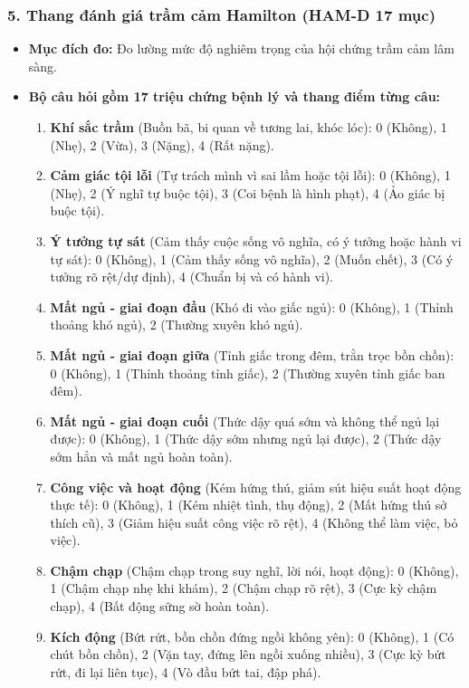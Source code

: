\documentclass[12pt,a4paper]{article}
\begin{document}
\subsubsection*{5. Thang đánh giá trầm cảm Hamilton (HAM-D 17 mục)}
\begin{itemize}
    \item \textbf{Mục đích đo:} Đo lường mức độ nghiêm trọng của hội chứng trầm cảm lâm sàng.
    \item \textbf{Bộ câu hỏi gồm 17 triệu chứng bệnh lý và thang điểm từng câu:}
    \begin{enumerate}
        \item \textbf{Khí sắc trầm} (Buồn bã, bi quan về tương lai, khóc lóc): 0 (Không), 1 (Nhẹ), 2 (Vừa), 3 (Nặng), 4 (Rất nặng).
        \item \textbf{Cảm giác tội lỗi} (Tự trách mình vì sai lầm hoặc tội lỗi): 0 (Không), 1 (Nhẹ), 2 (Ý nghĩ tự buộc tội), 3 (Coi bệnh là hình phạt), 4 (Ảo giác bị buộc tội).
        \item \textbf{Ý tưởng tự sát} (Cảm thấy cuộc sống vô nghĩa, có ý tưởng hoặc hành vi tự sát): 0 (Không), 1 (Cảm thấy sống vô nghĩa), 2 (Muốn chết), 3 (Có ý tưởng rõ rệt/dự định), 4 (Chuẩn bị và có hành vi).
        \item \textbf{Mất ngủ - giai đoạn đầu} (Khó đi vào giấc ngủ): 0 (Không), 1 (Thỉnh thoảng khó ngủ), 2 (Thường xuyên khó ngủ).
        \item \textbf{Mất ngủ - giai đoạn giữa} (Tỉnh giấc trong đêm, trằn trọc bồn chồn): 0 (Không), 1 (Thỉnh thoảng tỉnh giấc), 2 (Thường xuyên tỉnh giấc ban đêm).
        \item \textbf{Mất ngủ - giai đoạn cuối} (Thức dậy quá sớm và không thể ngủ lại được): 0 (Không), 1 (Thức dậy sớm nhưng ngủ lại được), 2 (Thức dậy sớm hẳn và mất ngủ hoàn toàn).
        \item \textbf{Công việc và hoạt động} (Kém hứng thú, giảm sút hiệu suất hoạt động thực tế): 0 (Không), 1 (Kém nhiệt tình, thụ động), 2 (Mất hứng thú sở thích cũ), 3 (Giảm hiệu suất công việc rõ rệt), 4 (Không thể làm việc, bỏ việc).
        \item \textbf{Chậm chạp} (Chậm chạp trong suy nghĩ, lời nói, hoạt động): 0 (Không), 1 (Chậm chạp nhẹ khi khám), 2 (Chậm chạp rõ rệt), 3 (Cực kỳ chậm chạp), 4 (Bất động sững sờ hoàn toàn).
        \item \textbf{Kích động} (Bứt rứt, bồn chồn đứng ngồi không yên): 0 (Không), 1 (Có chút bồn chồn), 2 (Vặn tay, đứng lên ngồi xuống nhiều), 3 (Cực kỳ bứt rứt, đi lại liên tục), 4 (Vò đầu bứt tai, đập phá).

\end{enumerate}
\end{itemize}
\end{document}

